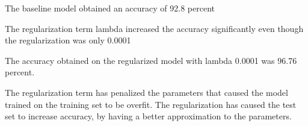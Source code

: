 \begin{answer}
The baseline model obtained an accuracy of 92.8 percent

The regularization term lambda increased the accuracy significantly even though the regularization was only 0.0001

The accuracy obtained on the regularized model with lambda 0.0001 was 96.76 percent.

The regularization term has penalized the parameters that caused the model trained on the training set to be overfit. The regularization has caused the test set to increase accuracy, by having a better approximation to the parameters.


\end{answer}
   
  

